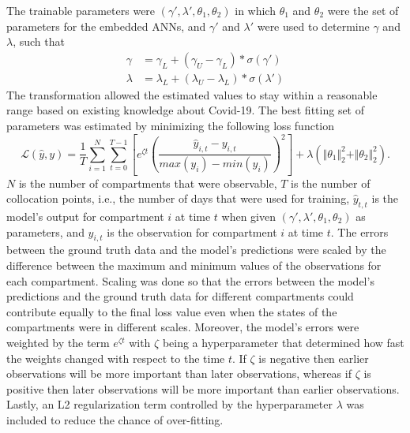 The trainable parameters were $(\gamma', \lambda', \theta_1, \theta_2)$ in which $\theta_1$ and $\theta_2$ were the set of parameters for the embedded \glspl{ANN}, and $\gamma'$ and $\lambda'$ were used to determine $\gamma$ and $\lambda$, such that
\begin{align*}
    \gamma &= \gamma_L + (\gamma_U - \gamma_L) * \sigma (\gamma') \\
    \lambda &= \lambda_L + (\lambda_U - \lambda_L) * \sigma (\lambda')
\end{align*}
The transformation allowed the estimated values to stay within a reasonable range based on existing knowledge about Covid-19.
The best fitting set of parameters was estimated by minimizing the following loss function
\begin{equation}
    \mathcal{L}(\hat{y}, y) = \frac{1}{T} \sum_{i=1}^N \sum_{t=0}^{T-1} \left[ e^{\zeta t} \left(\frac{\hat{y}_{i,t} - y_{i,t}}{max(y_i) - min(y_i)}\right)^2\right] + \lambda (\Vert\theta_1\Vert^2_2 + \Vert\theta_2\Vert^2_2).
    \label{eq:ude-model-loss}
\end{equation}
$N$ is the number of compartments that were observable, $T$ is the number of collocation points, i.e., the number of days that were used for training, $\hat{y}_{t,t}$ is the model's output for compartment $i$ at time $t$ when given $(\gamma', \lambda', \theta_1, \theta_2)$ as parameters, and $y_{i,t}$ is the observation for compartment $i$ at time $t$.
The errors between the ground truth data and the model's predictions were scaled by the difference between the maximum and minimum values of the observations for each compartment.
Scaling was done so that the errors between the model's predictions and the ground truth data for different compartments could contribute equally to the final loss value even when the states of the compartments were in different scales.
Moreover, the model's errors were weighted by the term $e^{\zeta t}$ with $\zeta$ being a hyperparameter that determined how fast the weights changed with respect to the time $t$.
If $\zeta$ is negative then earlier observations will be more important than later observations, whereas if $\zeta$ is positive then later observations will be more important than earlier observations.
Lastly, an L2 regularization term controlled by the hyperparameter $\lambda$ was included to reduce the chance of over-fitting.

